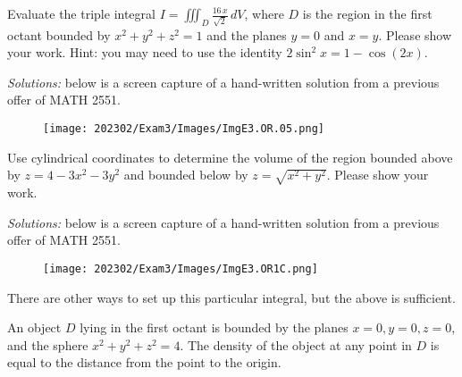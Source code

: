 

\ifnum {}
\question[6] Evaluate the triple integral $I=\displaystyle \iiint_D \frac{16\, x}{\sqrt2}  \, dV$, where $D$ is the region in the first octant bounded by $x^2+y^2+z^2=1$ and the planes $y=0$ and $x=y$. Please show your work. Hint: you may need to use the identity $2\sin ^2x = 1 - \cos(2x)$. 

\ifnum {} {\color{DarkBlue} \textit{Solutions:} below is a screen capture of a hand-written solution from a previous offer of MATH 2551. 
    \begin{figure}[h]
    \centering
    \texttt{[image: 202302/Exam3/Images/ImgE3.OR.05.png]}
    \end{figure}  
    
    } 
   \else
      
   \fi
    
\fi

\ifnum {}
\question[6] Use cylindrical coordinates to determine the volume of the region bounded above by $z = 4-3x^2-3y^2$ and bounded below by $z = \sqrt{x^2+y^2}$. Please show your work. 

\ifnum {} {\color{DarkBlue} \textit{Solutions:} below is a screen capture of a hand-written solution from a previous offer of MATH 2551. 
    \begin{figure}[h]
    \centering
    \texttt{[image: 202302/Exam3/Images/ImgE3.OR1C.png]}
    \end{figure}  
    
    There are other ways to set up this particular integral, but the above is sufficient. 

    } 
   \else
      
   \fi
    
\fi






\ifnum {}
\question[6] An object $D$ lying in the first octant is bounded by the planes $x=0, y=0, z=0$, and the sphere $x^2+y^2 + z^2 = 4$. The density of the object at any point in $D$ is equal to the distance from the point to the origin. 

